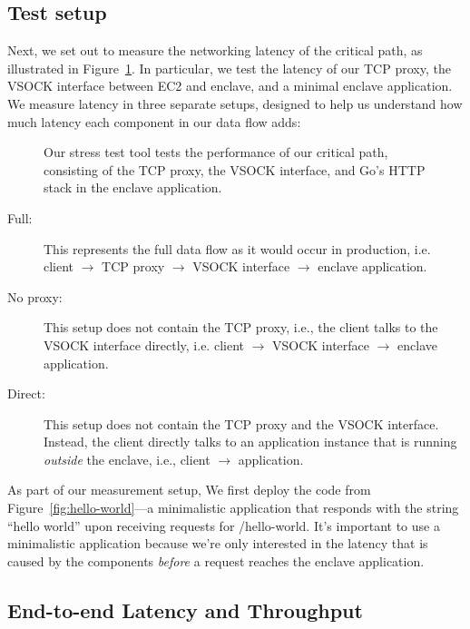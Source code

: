 \subsection{Test setup}
\label{sec:test-setup}

Next, we set out to measure the networking latency of the critical path, as
illustrated in Figure~\ref{fig:stress-test}.  In particular, we test the
latency of our TCP proxy, the VSOCK interface between EC2 and enclave, and a
minimal enclave application.
%
We measure latency in three separate setups, designed to help us understand how
much latency each component in our data flow adds:

\begin{figure}[t]
    \centering
    
    \caption{Our stress test tool tests the performance of our critical path,
    consisting of the TCP proxy, the VSOCK interface, and Go's HTTP stack in
    the enclave application.}
    \label{fig:stress-test}
\end{figure}

\begin{description}
  \item[Full:] This represents the full data flow as it would occur in
    production, i.e. client $\rightarrow$ TCP proxy $\rightarrow$ VSOCK
    interface $\rightarrow$ enclave application.

  \item[No proxy:] This setup does not contain the TCP proxy, i.e., the client
    talks to the VSOCK interface directly, i.e. client $\rightarrow$ VSOCK
    interface $\rightarrow$ enclave application.

  \item[Direct:] This setup does not contain the TCP proxy and the VSOCK
    interface.  Instead, the client directly talks to an application instance that is
    running \emph{outside} the enclave, i.e., client $\rightarrow$ application.
\end{description}

As part of our measurement setup, We first deploy the code from
Figure~\ref{fig:hello-world}---a minimalistic application that responds with
the string ``hello world'' upon receiving requests for /hello-world.  It's
important to use a minimalistic application because we're only interested in
the latency that is caused by the components \emph{before} a request reaches
the enclave application.

\subsection{End-to-end Latency and Throughput}
\label{sec:end-to-end}

